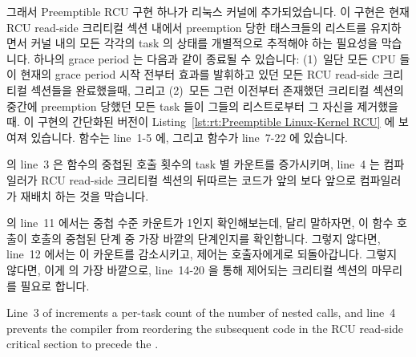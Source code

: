 그래서 Preemptible RCU 구현 하나가 리눅스 커널에 추가되었습니다.
이 구현은 현재 RCU read-side 크리티컬 섹션 내에서 preemption 당한 태스크들의
리스트를 유지하면서 커널 내의 모든 각각의 task 의 상태를 개별적으로 추적해야
하는 필요성을 막습니다.
하나의 grace period 는 다음과 같이 종료될 수 있습니다: (1)~일단 모든 CPU 들이
현재의 grace period 시작 전부터 효과를 발휘하고 있던 모든 RCU read-side
크리티컬 섹션들을 완료했을때, 그리고 (2)~모든 그런 이전부터 존재했던 크리티컬
섹션의 중간에 preemption 당했던 모든 task 들이 그들의 리스트로부터 그 자신을
제거했을 때.
이 구현의 간단화된 버전이
Listing~\ref{lst:rt:Preemptible Linux-Kernel RCU} 에 보여져 있습니다.
 함수는 line~1-5 에, 그리고 
함수가 line~7-22 에 있습니다.

 의 line~3 은  함수의 중첩된 호출
횟수의 task 별 카운트를 증가시키며, line~4 는 컴파일러가 RCU read-side 크리티컬
섹션의 뒤따르는 코드가 앞의  보다 앞으로 컴파일러가 재배치
하는 것을 막습니다.

 의 line~11 에서는 중첩 수준 카운트가 1인지
확인해보는데, 달리 말하자면, 이 함수 호출이  호출의
중첩된 단계 중 가장 바깥의 단계인지를 확인합니다.
그렇지 않다면, line~12 에서는 이 카운트를 감소시키고, 제어는 호출자에게로
되돌아갑니다.
그렇지 않다면, 이게  의 가장 바깥으로, line~14-20 을 통해
제어되는 크리티컬 섹션의 마무리를 필요로 합니다.
\iffalse

Line~3 of  increments a per-task count of the
number of nested  calls, and
line~4 prevents the compiler from reordering the subsequent code in the
RCU read-side critical section to precede the .

